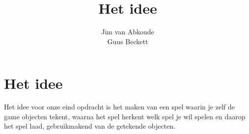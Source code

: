 


\title{Het idee}
\author{Jim van Abkoude\\Guus Beckett}

\clearpage\maketitle
\thispagestyle{empty}
\newpage

\tableofcontents
\newpage

\section{Het idee}
Het idee voor onze eind opdracht is het maken van een spel waarin je zelf de game objecten tekent, waarna het spel herkent welk spel je wil spelen en daarop het spel laad, gebruikmakend van de getekende objecten.



